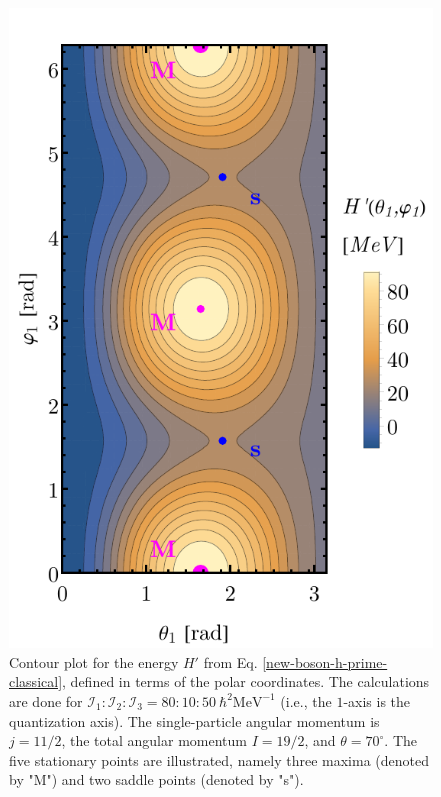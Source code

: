 \begin{figure}
    \begin{center}
        \includegraphics[scale=0.7]{Chapters/Figures/New-Boson-Classical-H-1axis-quantization.pdf}
        \caption{Contour plot for the energy $H'$ from Eq. \ref{new-boson-h-prime-classical}, defined in terms of the polar coordinates. The calculations are done for $\mathcal{I}_1:\mathcal{I}_2:\mathcal{I}_3=80:10:50\ \hbar^2\text{MeV}^{-1}$ (i.e., the $1$-axis is the quantization axis). The single-particle angular momentum is $j=11/2$, the total angular momentum $I=19/2$, and $\theta=70^\circ$. The five stationary points are illustrated, namely three maxima (denoted by "M") and two saddle points (denoted by "s").}
        \label{new-boson-hprime-1axis-contour-plot}
    \end{center}
\end{figure}

